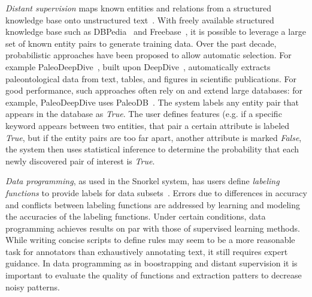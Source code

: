 \textit{Distant supervision} maps known entities and relations from a structured knowledge 
base onto unstructured text~\cite{peters2014machine,de2016deepdive}. 
With freely available structured knowledge base such as DBPedia~\cite{auer2007dbpedia} and Freebase~\cite{bollacker2008freebase}, it is possible to leverage a large set of known entity pairs to generate training data.
Over the past decade, probabilistic approaches have been proposed to allow automatic selection.
For example PaleoDeepDive~\cite{peters2014machine}, built upon DeepDive~\cite{de2016deepdive}, automatically extracts
paleontological data from text, tables, and figures in scientific publications. 
For good performance, such approaches often rely on and extend large databases: for example,
PaleoDeepDive uses PaleoDB~\cite{PaleoDB}. 
The system labels any entity pair that appears in the database as \textit{True}.
The user defines features (e.g. if a specific keyword appears between two entities, that pair a certain attribute is labeled \textit{True}, but if the entity pairs are too far apart, another attribute is marked \textit{False}, 
the system then uses statistical inference to determine the probability that each newly discovered pair of interest is \textit{True}.

\textit{Data programming}, as used in the Snorkel system, has users define 
\textit{labeling functions} to provide labels for data subsets~\cite{ratner2016data}. 
Errors due to differences in accuracy and conflicts between labeling functions are 
addressed by learning and modeling the accuracies of the labeling functions. 
Under certain conditions, data programming achieves results on par with those of supervised learning methods.
While writing concise scripts to define rules may seem to be a more reasonable task for annotators 
than exhaustively annotating text, it still requires expert guidance.  
In data programming as in boostrapping and distant supervision it is important to evaluate the quality of functions and extraction patters to decrease noisy patterns.

